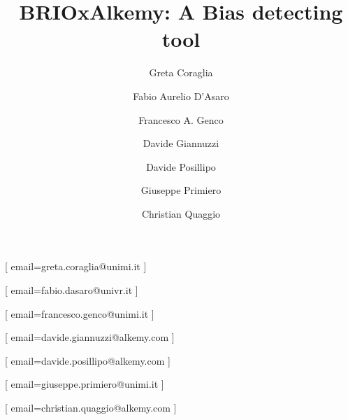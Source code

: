 \documentclass[
]{ceurart}
\begin{document}


\title{BRIOxAlkemy: A Bias detecting tool}

\tnotemark[1]


\author[1]{Greta Coraglia}[
email=greta.coraglia@unimi.it
]
\author[3]{Fabio Aurelio D'Asaro}[
email=fabio.dasaro@univr.it
]
\author[1]{Francesco A. Genco}[%
email=francesco.genco@unimi.it
]
\author[2]{Davide Giannuzzi}[
  email=davide.giannuzzi@alkemy.com
  ]
\author[2]{Davide Posillipo}[
email=davide.posillipo@alkemy.com
]
\author[1]{Giuseppe Primiero}[
email=giuseppe.primiero@unimi.it
]
\author[2]{Christian Quaggio}[
email=christian.quaggio@alkemy.com
]


\address[1]{LUCI Group, University of Milan, via Festa del Perdono 7, 20122 Milan, Italy}
\address[2]{Alkemy, Deep Learning \& Big Data Department}
\address[3]{Verona}


\end{document}
